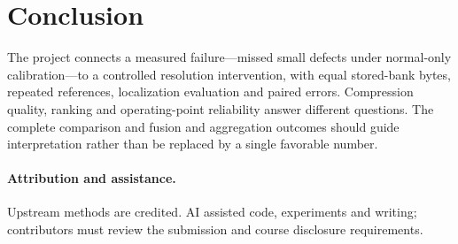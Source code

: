 \documentclass[10pt,twocolumn,letterpaper]{article}
\begin{document}
\section{Conclusion}
The project connects a measured failure---missed small defects under normal-only calibration---to a controlled resolution intervention, with equal stored-bank bytes, repeated references, localization evaluation and paired errors. Compression quality, ranking and operating-point reliability answer different questions. The complete comparison and fusion and aggregation outcomes should guide interpretation rather than be replaced by a single favorable number.
\paragraph{Attribution and assistance.} Upstream methods are credited. AI assisted code, experiments and writing; contributors must review the submission and course disclosure requirements.
\clearpage
{\small}
\end{document}
